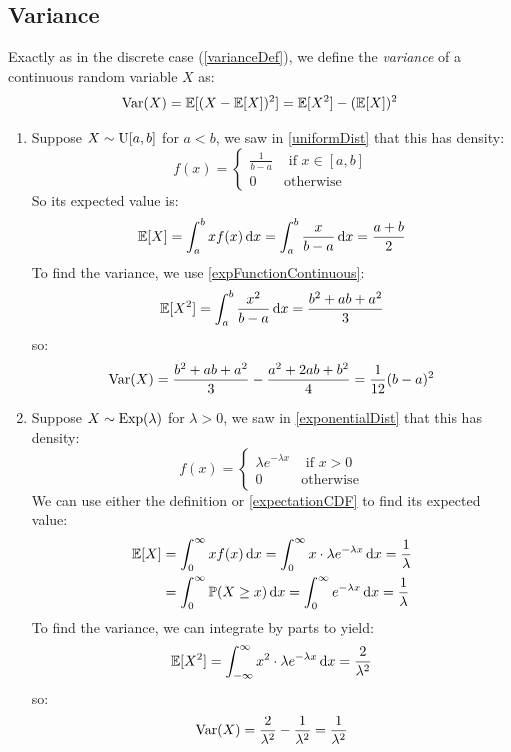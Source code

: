 \documentclass[../main.tex]{subfiles}
\begin{document}
\subsection{Variance}
\begin{definition}[Variance]
  Exactly as in the discrete case (\cref{varianceDef}), we define the \textit{variance} of a continuous random variable $X$ as:
  \[
    \operatorname{Var}(X) = \mathbb{E}[(X - \mathbb{E}[X])^2] = \mathbb{E}[X^2] - (\mathbb{E}[X])^2
  \]
\end{definition}
\begin{example}
  \begin{enumerate}
    \item Suppose $X \sim \operatorname{U}[a, b]$ for $a < b$, we saw in \cref{uniformDist} that this has density:
      \[
        f(x) = \begin{cases}
        \frac{1}{b-a} & \text{ if } x \in [a, b] \\
        0 & \text{otherwise}
        \end{cases}
      \]
      So its expected value is:
      \[
        \E[X] = \int_{a}^{b} xf(x) \d{x} = \int_{a}^{b} \frac{x}{b - a} \d{x} = \frac{a + b}{2}
      \]
      To find the variance, we use \cref{expFunctionContinuous}:
      \[
        \E[X^2] = \int_{a}^{b} \frac{x^2}{b - a} \d{x} = \frac{b^2 + ab + a^2}{3}
      \]
      so:
      \[
        \operatorname{Var}(X) = \frac{b^2 + ab + a^2}{3} - \frac{a^2 + 2ab + b^2}{4} = \frac{1}{12} (b - a)^2
      \]
    \item Suppose $X \sim \operatorname{Exp}(\lambda)$ for $\lambda > 0$, we saw in \cref{exponentialDist} that this has density:
      \[
        f(x) = \begin{cases}
        \lambda e^{-\lambda x} & \text{ if } x > 0 \\
        0 & \text{otherwise}
        \end{cases}
      \]
      We can use either the definition or \cref{expectationCDF} to find its expected value:
      \begin{align*}
        \E[X] &= \int_{0}^{\infty} xf(x) \d{x}=\int_{0}^{\infty} x\cdot\lambda e^{-\lambda x} \d{x} = \frac{1}{\lambda} \\
              &= \int_{0}^{\infty} \P(X \geq x) \d{x} = \int_{0}^{\infty} e^{-\lambda x} \d{x} = \frac{1}{\lambda}
      \end{align*}
      To find the variance, we can integrate by parts to yield:
      \[
        \E[X^2] = \int_{-\infty}^{\infty} x^2 \cdot \lambda e^{-\lambda x} \d{x} = \frac{2}{\lambda^2}
      \]
      so:
      \[
        \operatorname{Var}(X) = \frac{2}{\lambda^2} - \frac{1}{\lambda^2} = \frac{1}{\lambda^2}
      \]
  \end{enumerate}
\end{example}
\end{document}
